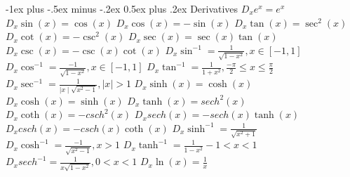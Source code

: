 \documentclass[10pt,landscape]{article}
\makeatletter
\renewcommand{\section}{\@startsection{section}{1}{0mm}%
                                {-1ex plus -.5ex minus -.2ex}%
                                {0.5ex plus .2ex}%
                                {\normalfont\large\bfseries}}
\makeatother
\begin{document}
\raggedright
\footnotesize
\begin{multicols*}{5}


\setlength{\premulticols}{1pt}
\setlength{\postmulticols}{1pt}
\setlength{\multicolsep}{1pt}
\setlength{\columnsep}{2pt}

\section{Derivatives}
\scriptsize
$D_x e^x=e^x$\newline
$D_x \sin(x)=\cos(x)$\newline
$D_x \cos(x)=-\sin(x)$\newline
$D_x \tan(x)=\sec^2(x)$\newline
$D_x \cot(x)=-\csc^2(x)$\newline
$D_x \sec(x)=\sec(x)\tan(x)$\newline
$D_x \csc(x)=-\csc(x)\cot(x)$\newline
$D_x \sin^{-1}=\frac{1}{\sqrt{1-x^2}}, x \in [-1,1]$\newline
$D_x \cos^{-1}=\frac{-1}{\sqrt{1-x^2}}, x \in [-1,1]$\newline
$D_x \tan^{-1}=\frac{1}{1+x^2}, \frac{-\pi}{2}\le x \le \frac{\pi}{2}$\newline
$D_x \sec^{-1}=\frac{1}{\mid x \mid \sqrt{x^2-1}}, |x| > 1$\newline
$D_x \sinh(x)=\cosh(x)$\newline
$D_x \cosh(x)=\sinh(x)$\newline
$D_x \tanh(x)=sech^2(x)$\newline
$D_x \coth(x)=-csch^2(x)$\newline
$D_x sech(x)=-sech(x)\tanh(x)$\newline
$D_x csch(x)=-csch(x)\coth(x)$\newline
$D_x \sinh^{-1}=\frac{1}{\sqrt{x^2+1}}$\newline
$D_x \cosh^{-1}=\frac{-1}{\sqrt{x^2-1}}, x > 1$\newline
$D_x \tanh^{-1}=\frac{1}{1-x^2} -1 < x < 1$\newline
$D_x sech^{-1}=\frac{1}{x \sqrt{1-x^2}}, 0 < x < 1$
$ D_x \ln(x) = \frac{1}{x} $


\end{multicols*}
\end{document}
